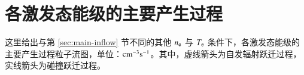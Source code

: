 \graphicspath{{figures/appendix-inflow/}}

\chapter{各激发态能级的主要产生过程}
\label{appendix:main-inflow}

这里给出与第 \ref{sec:main-inflow} 节不同的其他 $n_{\rm e}$ 与 $T_{\rm e}$ 条件下，各激发态能级的主要产生过程粒子流图，单位：${\rm cm}^{-3}{\rm s}^{-1}$。其中，虚线箭头为自发辐射跃迁过程，实线箭头为碰撞跃迁过程。
\begin{center}
\\
\vspace{2em}
\\
\vspace{2em}
\end{center} 